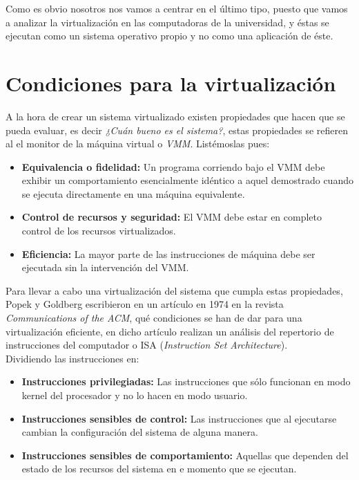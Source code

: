 \noindent Como es obvio nosotros nos vamos a centrar en el último tipo, puesto que vamos a analizar la virtualización en las computadoras de la universidad, y éstas se ejecutan como un sistema operativo propio y no como una aplicación de éste.

\section{Condiciones para la virtualización}

\noindent A la hora de crear un sistema virtualizado existen propiedades que hacen que se pueda evaluar, es decir \emph{¿Cuán bueno es el sistema?}, estas propiedades se refieren al el monitor de la máquina virtual o \emph{VMM}. Listémoslas pues:
\begin{itemize}
\item \textbf{Equivalencia o fidelidad:} Un programa corriendo bajo el VMM debe exhibir un comportamiento  esencialmente idéntico a aquel demostrado cuando se ejecuta directamente en una máquina equivalente.
\item \textbf{Control de recursos y seguridad:} El VMM debe estar en completo control de los recursos virtualizados.
\item \textbf{Eficiencia:} La mayor parte de las instrucciones de máquina debe ser ejecutada sin la intervención del VMM.
\end{itemize}

\noindent Para llevar a cabo una virtualización del sistema que cumpla estas propiedades, Popek y Goldberg escribieron en un artículo en 1974 en la revista \emph{Communications of the ACM}\cite{reqvir}, qué condiciones se han de dar para una virtualización eficiente, en dicho artículo realizan un análisis del repertorio de instrucciones del computador o ISA (\emph{Instruction Set Architecture}).\\

\noindent Dividiendo las instrucciones en:
\begin{itemize}
\item \textbf{Instrucciones privilegiadas:} Las instrucciones que sólo funcionan en modo kernel del procesador y no lo hacen en modo usuario.
\item \textbf{Instrucciones sensibles de control:} Las instrucciones que al ejecutarse cambian la configuración del sistema de alguna manera.
\item \textbf{Instrucciones sensibles de comportamiento:} Aquellas que dependen del estado de los recursos del sistema en e momento que se ejecutan. 
\end{itemize}


